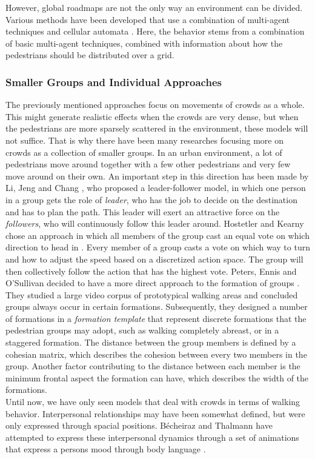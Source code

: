 \documentclass[11pt]{article}
\begin{document}
However, global roadmaps are not the only way an environment can be divided. Various methods have been developed that use a combination of multi-agent techniques and cellular automata \cite{Dijkstra00amulti-agent}\cite{1241047}. Here, the behavior stems from a combination of basic multi-agent techniques, combined with information about how the pedestrians should be distributed over a grid.


\subsubsection{Smaller Groups and Individual Approaches}
The previously mentioned approaches focus on movements of crowds as a whole. This might generate realistic effects when the crowds are very dense, but when the pedestrians are more sparsely scattered in the environment, these models will not suffice. That is why there have been many researches focusing more on crowds as a collection of smaller groups. In an urban environment, a lot of pedestrians move around together with a few other pedestrians and very few move around on their own. An important step in this direction has been made by Li, Jeng and Chang \cite{leaderfollower}, who proposed a leader-follower model, in which one person in a group gets the role of \emph{leader}, who has the job to decide on the destination and has to plan the path. This leader will exert an attractive force on the \emph{followers}, who will continuously follow this leader around. Hostetler and Kearny chose an approach in which all members of the group cast an equal vote on which direction to head in \cite{Hostetler02strollingdown}. Every member of a group casts a vote on which way to turn and how to adjust the speed based on a discretized action space. The group will then collectively follow the action that has the highest vote. Peters, Ennis and O'Sullivan decided to have a more direct approach to the formation of groups \cite{10.1109MCG.2009.69}. They studied a large video corpus of prototypical walking areas and concluded groups always occur in certain formations. Subsequently, they designed a number of formations in a \emph{formation template} that represent discrete formations that the pedestrian groups may adopt, such as walking completely abreast, or in a staggered formation. The distance between the group members is defined by a cohesian matrix, which describes the cohesion between every two members in the group. Another factor contributing to the distance between each member is the minimum frontal aspect the formation can have, which describes the width of the formations.\\
Until now, we have only seen models that deal with crowds in terms of walking behavior. Interpersonal relationships may have been somewhat defined, but were only expressed through spacial positions. Bécheiraz and Thalmann have attempted to express these interpersonal dynamics through a set of animations that express a persons mood through body language \cite{Becheiraz:1996:MNC:791215.791499}.
\end{document}
